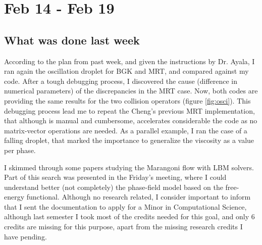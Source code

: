 \documentclass[12pt]{article}
\begin{document}
	\pagebreak
	\section*{Feb 14 - Feb 19}
	\subsection*{What was done last week}
	According to the plan from past week, and given the instructions by Dr. Ayala, I ran again the oscillation droplet for BGK and MRT, and compared against my code. After a tough debugging process, I discovered the cause (difference in numerical parameters) of the discrepancies in the MRT case. Now, both codes are providing the same results for the two collision operators (figure \ref{fig:osci}). This debugging process lead me to repeat the Cheng's previous MRT implementation, that although is manual and cumbersome, accelerates considerable the code as no matrix-vector operations are needed. As a parallel example, I ran the case of a falling droplet, that marked the importance to generalize the viscosity as a value per phase.
	
	I skimmed through some papers studying the Marangoni flow with LBM solvers. Part of this search was presented in the Friday's meeting, where I could understand better (not completely) the phase-field model based on the free-energy functional. Although no research related, I consider important to inform that I sent the documentation to apply for a Minor in Computational Science, although last semester I took most of the credits needed for this goal, and only 6 credits are missing for this purpose, apart from the missing research credits I have pending. 
	
\end{document}
